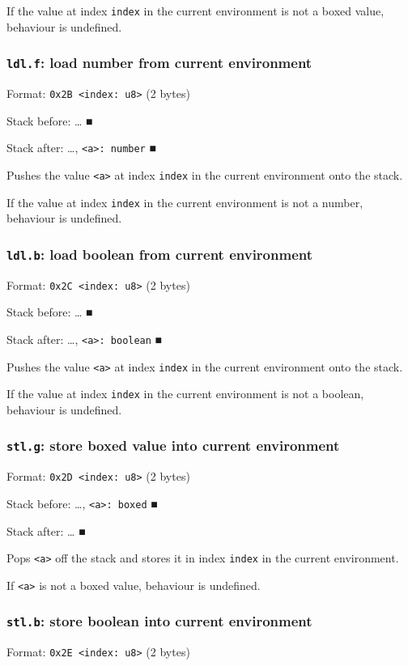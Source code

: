 If the value at index \texttt{index} in the current environment is not a boxed
value, behaviour is undefined.

\subsubsection{\texttt{ldl.f}: load number from current environment}
\label{sec:orgb7a98c2}
Format: \texttt{0x2B <index: u8>} (2 bytes)

Stack before: \ldots{}​ ■

Stack after: \ldots{}​, \texttt{<a>: number} ■

Pushes the value \texttt{<a>} at index \texttt{index} in the current environment onto
the stack.

If the value at index \texttt{index} in the current environment is not a
number, behaviour is undefined.

\subsubsection{\texttt{ldl.b}: load boolean from current environment}
\label{sec:org671ebc7}
Format: \texttt{0x2C <index: u8>} (2 bytes)

Stack before: \ldots{}​ ■

Stack after: \ldots{}​, \texttt{<a>: boolean} ■

Pushes the value \texttt{<a>} at index \texttt{index} in the current environment onto
the stack.

If the value at index \texttt{index} in the current environment is not a
boolean, behaviour is undefined.

\subsubsection{\texttt{stl.g}: store boxed value into current environment}
\label{sec:org466d475}
Format: \texttt{0x2D <index: u8>} (2 bytes)

Stack before: \ldots{}​, \texttt{<a>: boxed} ■

Stack after: \ldots{}​ ■

Pops \texttt{<a>} off the stack and stores it in index \texttt{index} in the current
environment.

If \texttt{<a>} is not a boxed value, behaviour is undefined.

\subsubsection{\texttt{stl.b}: store boolean into current environment}
\label{sec:org711619f}
Format: \texttt{0x2E <index: u8>} (2 bytes)

